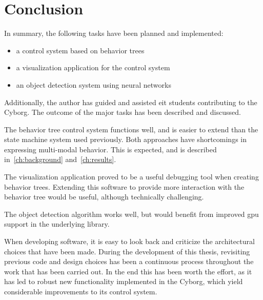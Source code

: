 \documentclass[\rootfolder/main.tex]{subfiles}
\begin{document}
\chapter{Conclusion} %
\label{ch:conclusion} %

In summary, the following tasks have been planned and implemented:

\begin{itemize}
    \item a control system based on behavior trees
    \item a visualization application for the control system
    \item an object detection system using neural networks
\end{itemize}

Additionally, the author has guided and assisted \acrshort{eit} students contributing to the Cyborg.
The outcome of the major tasks has been described and discussed.

The behavior tree control system functions well, and is easier to extend than the state machine system used previously.
Both approaches have shortcomings in expressing multi-modal behavior.
This is expected, and is described in~\cref{ch:background} and~\cref{ch:results}.

The visualization application proved to be a useful debugging tool when creating behavior trees.
Extending this software to provide more interaction with the behavior tree would be useful, although technically challenging.

The object detection algorithm works well, but would benefit from improved \acrshort{gpu} support in the underlying library.

When developing software, it is easy to look back and criticize the architectural choices that have been made.
During the development of this thesis, revisiting previous code and design choices has been a continuous process throughout the work that has been carried out.
In the end this has been worth the effort, as it has led to robust new functionality implemented in the Cyborg, which yield considerable improvements to its control system.
\end{document}
